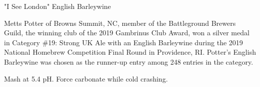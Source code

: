 \stylesection{\styleenglishbarleywine}

\begin{recipie}{"I See London" English Barleywine}

\begin{aboutblock}
Metts Potter of Browns Summit, NC, member of the Battleground Brewers Guild,
the winning club of the 2019 Gambrinus Club Award, won a silver medal in
Category \#19: Strong UK Ale with an English Barleywine during the 2019 National
Homebrew Competition Final Round in Providence, RI. Potter's English Barleywine
was chosen as the runner-up entry among 248 entries in the category.
\end{aboutblock}


\begin{methodandtiming}
 
\begin{mashsteps}
\end{mashsteps}

\begin{fermentationsteps}
\end{fermentationsteps}

\begin{directions}
Mash at 5.4 pH. Force carbonate while cold crashing.
\end{directions}

\end{methodandtiming}

\pagebreak

\begin{ingredientsblock}

\begin{malts}
\end{malts}

\begin{hops}
\end{hops}

\begin{yeasts}
\end{yeasts}

\end{ingredientsblock}

\end{recipie}
